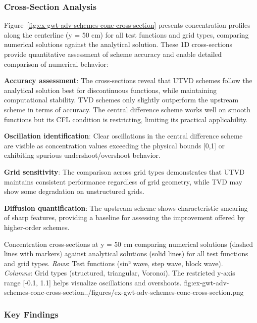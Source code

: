 \subsubsection{Cross-Section Analysis}

Figure~\ref{fig:ex-gwt-adv-schemes-conc-cross-section} presents concentration profiles along the centerline (y = 50 cm) for all test functions and grid types, comparing numerical solutions against the analytical solution. These 1D cross-sections provide quantitative assessment of scheme accuracy and enable detailed comparison of numerical behavior:

\textbf{Accuracy assessment}: The cross-sections reveal that UTVD schemes follow the analytical solution best for discontinuous functions, while maintaining computational stability. TVD schemes only slightly outperform the upstream scheme in terms of accuracy. The central difference scheme works well on smooth functions but its CFL condition is restricting, limiting its practical applicability.

\textbf{Oscillation identification}: Clear oscillations in the central difference scheme are visible as concentration values exceeding the physical bounds [0,1] or exhibiting spurious undershoot/overshoot behavior.

\textbf{Grid sensitivity}: The comparison across grid types demonstrates that UTVD maintains consistent performance regardless of grid geometry, while TVD may show some degradation on unstructured grids.

\textbf{Diffusion quantification}: The upstream scheme shows characteristic smearing of sharp features, providing a baseline for assessing the improvement offered by higher-order schemes.

\begin{StandardFigure}{
    Concentration cross-sections at y = 50 cm comparing numerical solutions (dashed lines with markers) against analytical solutions (solid lines) for all test functions and grid types. \textit{Rows}: Test functions (sin² wave, step wave, block wave). \textit{Columns}: Grid types (structured, triangular, Voronoi). The restricted y-axis range [-0.1, 1.1] helps visualize oscillations and overshoots.
}{fig:ex-gwt-adv-schemes-conc-cross-section}{../figures/ex-gwt-adv-schemes-conc-cross-section.png}
\end{StandardFigure}

\subsubsection{Key Findings}

